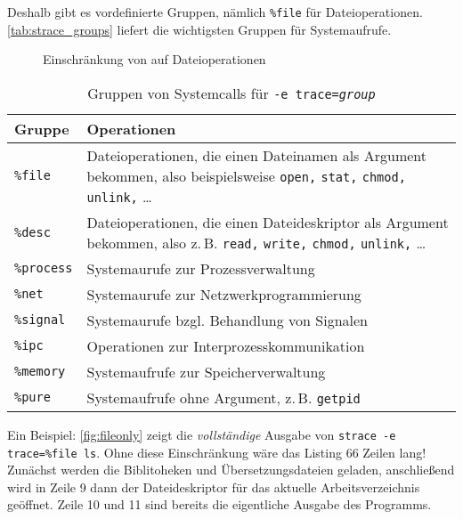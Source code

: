 Deshalb gibt es vordefinierte Gruppen, nämlich \texttt{\%file} für Dateioperationen.
\autoref{tab:strace_groups} liefert die wichtigsten Gruppen für Systemaufrufe.


\begin{figure*}[tb]
  
  \caption{Einschränkung von \strace{} auf Dateioperationen}
  \label{fig:fileonly}
\end{figure*}


\begin{table}[htb]
  \centering\small
  \begin{tabular}{|lp{6cm}|}
    \hline
    \textbf{Gruppe} & \textbf{Operationen} \\
    \hline
    \texttt{\%file}          & Dateioperationen, die einen Dateinamen als Argument
                               bekommen, also beispielsweise \texttt{open,} \texttt{stat,}
                               \texttt{chmod,} \texttt{unlink,} … \\
    \texttt{\%desc}          & Dateioperationen, die einen Dateideskriptor als Argument
                               bekommen, also z.\,B. \texttt{read,} \texttt{write,}
                               \texttt{chmod,} \texttt{unlink,} … \\
    \texttt{\%process}       & Systemaurufe zur Prozessverwaltung \\
    \texttt{\%net}           & Systemaurufe zur Netzwerkprogrammierung \\
    \texttt{\%signal}        & Systemaurufe bzgl. Behandlung von Signalen \\
    \texttt{\%ipc}           & Operationen zur Interprozesskommunikation \\
    \texttt{\%memory}        & Systemaufrufe zur Speicherverwaltung \\
    \texttt{\%pure}          & Systemaufrufe ohne Argument, z.\,B. \texttt{getpid} \\
    \hline
  \end{tabular}
  \caption{Gruppen von Systemcalls für \texttt{-e trace=\emph{group}}}
  \label{tab:strace_groups}
\end{table}

Ein Beispiel: \autoref{fig:fileonly} zeigt die \emph{vollständige} Ausgabe von \texttt{strace -e 
trace=\%file ls}. Ohne diese Einschränkung wäre das Listing 66 Zeilen lang! Zunächst werden
die Biblitoheken und Übersetzungsdateien geladen, anschließend wird in Zeile 9 dann der
Dateideskriptor für das aktuelle Arbeitsverzeichnis geöffnet. Zeile 10 und 11 sind bereits
die eigentliche Ausgabe des Programms.

